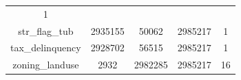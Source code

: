 \documentclass[]{book}
\theoremstyle{definition}
\theoremstyle{definition}
\theoremstyle{definition}
\theoremstyle{remark}
\begin{document}
\begin{longtable}[]{@{}ccccc@{}}
\begin{minipage}[t]{0.12\columnwidth}
1\strut
\end{minipage}\tabularnewline
\begin{minipage}[t]{0.25\columnwidth}\centering\strut
str\_flag\_tub\strut
\end{minipage} & \begin{minipage}[t]{0.12\columnwidth}\centering\strut
2935155\strut
\end{minipage} & \begin{minipage}[t]{0.13\columnwidth}\centering\strut
50062\strut
\end{minipage} & \begin{minipage}[t]{0.12\columnwidth}\centering\strut
2985217\strut
\end{minipage} & \begin{minipage}[t]{0.12\columnwidth}\centering\strut
1\strut
\end{minipage}\tabularnewline
\begin{minipage}[t]{0.25\columnwidth}\centering\strut
tax\_delinquency\strut
\end{minipage} & \begin{minipage}[t]{0.12\columnwidth}\centering\strut
2928702\strut
\end{minipage} & \begin{minipage}[t]{0.13\columnwidth}\centering\strut
56515\strut
\end{minipage} & \begin{minipage}[t]{0.12\columnwidth}\centering\strut
2985217\strut
\end{minipage} & \begin{minipage}[t]{0.12\columnwidth}\centering\strut
1\strut
\end{minipage}\tabularnewline
\begin{minipage}[t]{0.25\columnwidth}\centering\strut
zoning\_landuse\strut
\end{minipage} & \begin{minipage}[t]{0.12\columnwidth}\centering\strut
2932\strut
\end{minipage} & \begin{minipage}[t]{0.13\columnwidth}\centering\strut
2982285\strut
\end{minipage} & \begin{minipage}[t]{0.12\columnwidth}\centering\strut
2985217\strut
\end{minipage} & \begin{minipage}[t]{0.12\columnwidth}\centering\strut
16\strut
\end{minipage}\tabularnewline
\bottomrule
\end{longtable}
\end{document}
